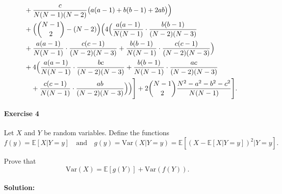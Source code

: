 \documentclass[a4paper,12pt]{article}
\begin{document}
\begin{itemize}
\begin{align*}
        &\quad + \frac{c}{N(N-1)(N-2)}\bigl(a(a-1)+b(b-1)+2ab\bigr)\Bigr) \\
        &\quad + \Bigl(\binom{N-1}{2}-(N-2)\Bigr)\Bigl(
            4 \Bigl(
            \frac{a(a-1)}{N(N-1)}\cdot\frac{b(b-1)}{(N-2)(N-3)} \\
          &\quad + \frac{a(a-1)}{N(N-1)}\cdot\frac{c(c-1)}{(N-2)(N-3)} + \frac{b(b-1)}{N(N-1)}\cdot\frac{c(c-1)}{(N-2)(N-3)} \Bigr) \\
        &\quad + 4 \Bigl(
            \frac{a(a-1)}{N(N-1)}\cdot\frac{bc}{(N-2)(N-3)} + \frac{b(b-1)}{N(N-1)}\cdot\frac{ac}{(N-2)(N-3)} \\
        &\qquad + \frac{c(c-1)}{N(N-1)}\cdot\frac{ab}{(N-2)(N-3)}\Bigr)\Bigr)\Biggr] + 2 \binom{N - 1}{2} \frac{N^2 - a^2 - b^2 - c^2}{N(N - 1)} \Biggr].
    \end{align*}
\end{itemize}

\paragraph{Exercise 4}  Let $X$ and $Y$ be random variables. Define the functions
\[ f(y) = \mathbb{E}[X|Y=y] \quad \textrm{and} \quad g(y) = \textrm{Var}(X|Y=y) = \mathbb{E} \left[ \left( X - \mathbb{E}[X | Y=y] \right)^2 | Y = y \right]. \]

 Prove that
\[ \textrm{Var}(X) = \mathbb{E}[ g(Y) ] + \textrm{Var}( f(Y) ). \]

\paragraph{Solution:}
\end{document}
